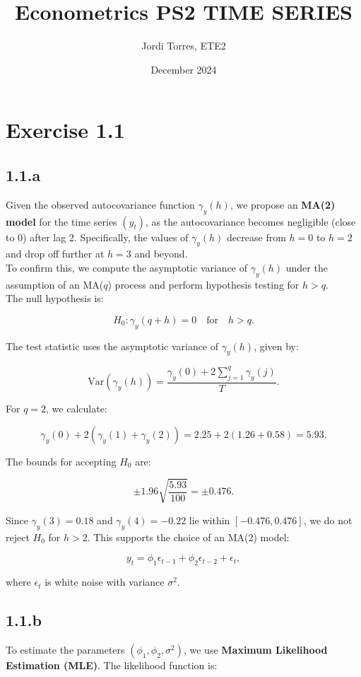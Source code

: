 \documentclass{article}
\title{Econometrics PS2 TIME SERIES}
\author{Jordi Torres, ETE2}
\date{December 2024}
\begin{document}
\maketitle


\section*{Exercise 1.1}

\subsection*{1.1.a}
Given the observed autocovariance function \( \gamma_y(h) \), we propose an \textbf{MA(2) model} for the time series \( (y_t) \), as the autocovariance becomes negligible (close to 0) after lag 2. Specifically, the values of \( \gamma_y(h) \) decrease from \( h = 0 \) to \( h = 2 \) and drop off further at \( h = 3 \) and beyond.\\

To confirm this, we compute the asymptotic variance of \( \gamma_y(h) \) under the assumption of an MA(\( q \)) process and perform hypothesis testing for \( h > q \). \\


The null hypothesis is:

\[
H_0: \gamma_y(q + h) = 0 \quad \text{for} \quad h > q.
\]

The test statistic uses the asymptotic variance of \( \gamma_y(h) \), given by:

\[
\text{Var}(\gamma_y(h)) = \frac{\gamma_y(0) + 2 \sum_{j=1}^q \gamma_y(j)}{T}.
\]

For \( q = 2 \), we calculate:

\[
\gamma_y(0) + 2(\gamma_y(1) + \gamma_y(2)) = 2.25 + 2(1.26 + 0.58) = 5.93.
\]

The bounds for accepting \( H_0 \) are:

\[
\pm 1.96 \sqrt{\frac{5.93}{100}} = \pm 0.476.
\]

Since \( \gamma_y(3) = 0.18 \) and \( \gamma_y(4) = -0.22 \) lie within \( [-0.476, 0.476] \), we do not reject \( H_0 \) for \( h > 2 \). This supports the choice of an MA(2) model:

\[
y_t = \phi_1 \epsilon_{t-1} + \phi_2 \epsilon_{t-2} + \epsilon_t,
\]

where \( \epsilon_t \) is white noise with variance \( \sigma^2 \).

\subsection*{1.1.b}
To estimate the parameters \( (\phi_1, \phi_2, \sigma^2) \), we use \textbf{Maximum Likelihood Estimation (MLE)}. The likelihood function is:
\end{document}
